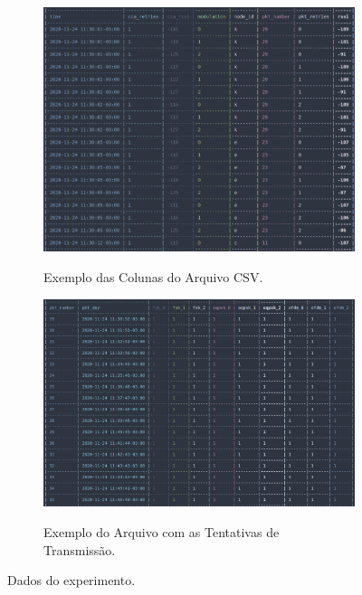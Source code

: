 \begin{figure}[h]
    \centering
    \begin{subfigure}{.4\textwidth}
        \centering
        \caption{Exemplo das Colunas do Arquivo CSV.}
        \includegraphics[width=\textwidth]{./sections/textual/chapters/images/csv_example.png}
        \label{fig:csv_example}
    \end{subfigure}
    \begin{subfigure}{.4\textwidth}
        \centering
        \caption{Exemplo do Arquivo com as Tentativas de Transmissão.}
        \includegraphics[width=\textwidth]{./sections/textual/chapters/images/second_csv_example.png}
        \label{fig:second_csv_example}
    \end{subfigure}
    \caption{Dados do experimento.}
    \label{fig:test}
\end{figure}

